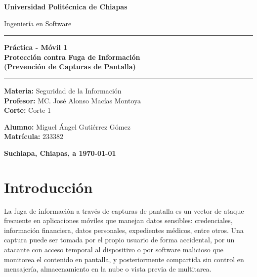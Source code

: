 \documentclass[12pt, a4paper]{article}
\newcommand{\nombreuniversidad}{Universidad Politécnica de Chiapas}
\newcommand{\nombrecarrera}{Ingeniería en Software}
\newcommand{\nombremateria}{Seguridad de la Información}
\newcommand{\nombreprofesor}{MC. José Alonso Macías Montoya}
\newcommand{\corte}{Corte 1}
\newcommand{\actividad}{Práctica - Móvil 1 \\ Protección contra Fuga de Información \\ (Prevención de Capturas de Pantalla)}
\newcommand{\nombres}{Miguel Ángel Gutiérrez Gómez}
\newcommand{\matricula}{233382}
\newcommand{\fechaentrega}{\today}
\newcommand{\ciudad}{Suchiapa, Chiapas}
\begin{document}
\begin{titlepage}
    \centering
    \vspace*{1cm}
    {\Huge\bfseries \nombreuniversidad \par}
    \vspace{0.5cm}
    {\Large \nombrecarrera \par}

    \vspace{2cm}
    \rule{\textwidth}{1.5pt}
    \vspace{0.4cm}
    {\Large\bfseries \actividad \par}
    \vspace{0.4cm}
    \rule{\textwidth}{1.5pt}

    \vspace{3cm}

    \begin{flushleft}
        \centering
        \textbf{Materia:} \nombremateria \\
        \textbf{Profesor:} \nombreprofesor \\
        \textbf{Corte:} \corte
    \end{flushleft}

    \vspace{0.5cm}

    \begin{flushleft}
        \centering
        \textbf{Alumno:} \nombres \\
        \textbf{Matrícula:} \matricula \\
    \end{flushleft}

    \vfill

    \vspace{1cm}
    \textbf{\ciudad, a \fechaentrega}

\end{titlepage}

\clearpage

\tableofcontents
\clearpage


\section{Introducción}
\label{sec:introduccion}
La fuga de información a través de capturas de pantalla es un vector de ataque
frecuente en aplicaciones móviles que manejan datos sensibles: credenciales,
información financiera, datos personales, expedientes médicos, entre otros.
Una captura puede ser tomada por el propio usuario de forma accidental,
por un atacante con acceso temporal al dispositivo o por software malicioso
que monitorea el contenido en pantalla, y posteriormente compartida sin
control en mensajería, almacenamiento en la nube o vista previa de
multitarea.
\end{document}
